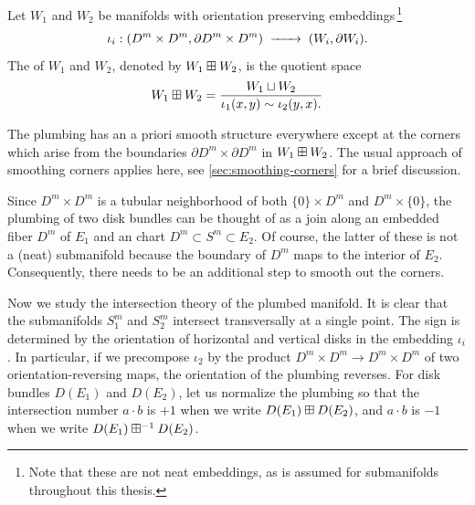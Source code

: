 \begin{definition}\label{def:plumbing}
	Let $W_1$ and $W_2$ be manifolds with orientation preserving embeddings\,\footnote{Note that these are not neat embeddings, as is assumed for submanifolds throughout this thesis.}
	\[\iota_i : (D^m\times D^m, \partial D^m\times D^m)\lkxto (W_i, \partial W_i).\]
	The  of $W_1$ and $W_2$, denoted by $W_1\boxplus W_2$, is the quotient space
	\[
		W_1\boxplus W_2 = \frac{W_1\sqcup W_2}{\iota_1(x,y)\sim \iota_2(y,x).}
	\]
\end{definition}

\begin{remark*}\label{rmk:smoothing-corners}
	The plumbing has an a priori smooth structure everywhere except at the corners which arise from the boundaries $\partial D^m\times \partial D^m$ in $W_1\boxplus W_2$. The usual approach of smoothing corners applies here, see \cref{sec:smoothing-corners} for a brief discussion.
\end{remark*}

\begin{remark*}
	Since $D^m\times D^m$ is a tubular neighborhood of both $\{0\}\times D^m$ and $D^m\times\{0\}$, the plumbing of two disk bundles can be thought of as a join along an embedded fiber $D^m$ of $E_1$ and an chart $D^m\subset S^m\subset E_2$. Of course, the latter of these is not a (neat) submanifold because the boundary of $D^m$ maps to the interior of $E_2$. Consequently, there needs to be an additional step to smooth out the corners.
\end{remark*}

Now we study the intersection theory of the plumbed manifold. It is clear that the submanifolds $S_1^m$ and $S_2^m$ intersect transversally at a single point. The sign is determined by the orientation of horizontal and vertical disks in the embedding $\iota_i$. In particular, if we precompose $\iota_2$ by the product $D^m\times D^m\to D^m\times D^m$ of two orientation-reversing maps, the orientation of the plumbing reverses. For disk bundles $D(E_1)$ and $D(E_2)$, let us normalize the plumbing so that the intersection number $a\cdot b$ is $+1$ when we write $D(E_1)\boxplus D(E_2)$, and $a\cdot b$ is $-1$ when we write $D(E_1)\boxplus^{-1} D(E_2)$.

